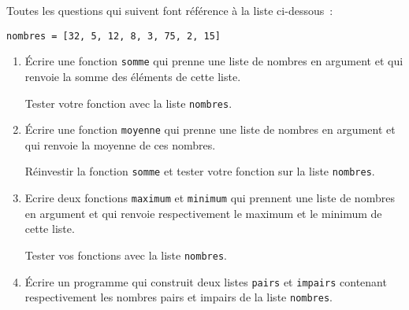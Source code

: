\begin{exercice}
Toutes les questions qui suivent font référence à la liste ci-dessous~:

\texttt{nombres = [32, 5, 12, 8, 3, 75, 2, 15]}
	\begin{enumerate}
	\item Écrire une fonction \texttt{somme} qui prenne une liste de nombres en argument et qui
	renvoie la somme des éléments de cette liste.

	Tester votre fonction avec la liste \texttt{nombres}.
	\item Écrire une fonction \texttt{moyenne} qui prenne une liste de nombres en argument
	et qui renvoie la moyenne de ces nombres.

	Réinvestir la fonction \texttt{somme}
	et tester votre fonction sur la liste \texttt{nombres}.

	\item Ecrire deux fonctions \texttt{maximum} et \texttt{minimum} qui prennent une liste
	de nombres en argument et qui renvoie respectivement le maximum et le minimum de cette liste.

	Tester vos fonctions avec la liste \texttt{nombres}.

	\item Écrire un programme qui construit deux listes \texttt{pairs} et \texttt{impairs}
	contenant respectivement les nombres pairs et impairs de la liste \texttt{nombres}.
	\end{enumerate}
\end{exercice}

